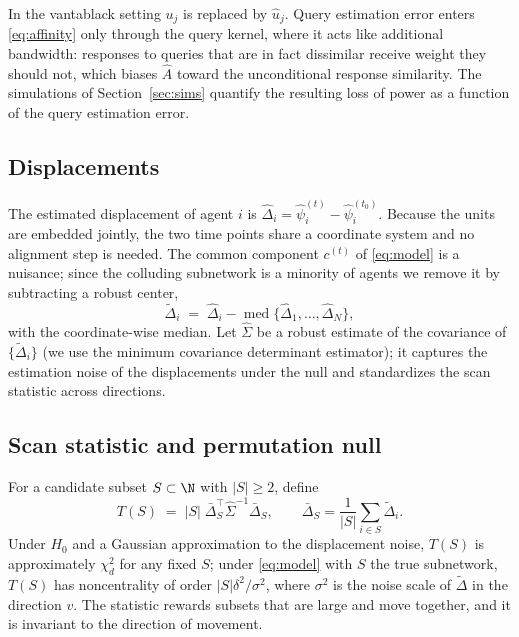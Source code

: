 In the vantablack setting $u_j$ is replaced by $\hat u_j$. Query estimation error enters \eqref{eq:affinity} only through the query kernel, where it acts like additional bandwidth: responses to queries that are in fact dissimilar receive weight they should not, which biases $\hat A$ toward the unconditional response similarity. The simulations of Section~\ref{sec:sims} quantify the resulting loss of power as a function of the query estimation error.

\subsection{Displacements}
\label{sec:disp}

The estimated displacement of agent $i$ is $\hat\Delta_i = \hat\psi_i^{(t)} - \hat\psi_i^{(t_0)}$. Because the units are embedded jointly, the two time points share a coordinate system and no alignment step is needed. The common component $c^{(t)}$ of \eqref{eq:model} is a nuisance; since the colluding subnetwork is a minority of agents we remove it by subtracting a robust center,
\begin{equation}
\tilde\Delta_i \;=\; \hat\Delta_i - \operatorname{med}\{\hat\Delta_1,\dots,\hat\Delta_N\},
\end{equation}
with the coordinate-wise median. Let $\hat\Sigma$ be a robust estimate of the covariance of $\{\tilde\Delta_i\}$ (we use the minimum covariance determinant estimator); it captures the estimation noise of the displacements under the null and standardizes the scan statistic across directions.

\subsection{Scan statistic and permutation null}
\label{sec:scan}

For a candidate subset $S\subset\N$ with $|S|\ge 2$, define
\begin{equation}
\label{eq:TS}
T(S) \;=\; |S|\;\bar\Delta_S^\top\hat\Sigma^{-1}\bar\Delta_S, \qquad \bar\Delta_S = \frac{1}{|S|}\sum_{i\in S}\tilde\Delta_i .
\end{equation}
Under $H_0$ and a Gaussian approximation to the displacement noise, $T(S)$ is approximately $\chi^2_d$ for any fixed $S$; under \eqref{eq:model} with $S$ the true subnetwork, $T(S)$ has noncentrality of order $|S|\delta^2/\sigma^2$, where $\sigma^2$ is the noise scale of $\tilde\Delta$ in the direction $v$. The statistic rewards subsets that are large and move together, and it is invariant to the direction of movement.

